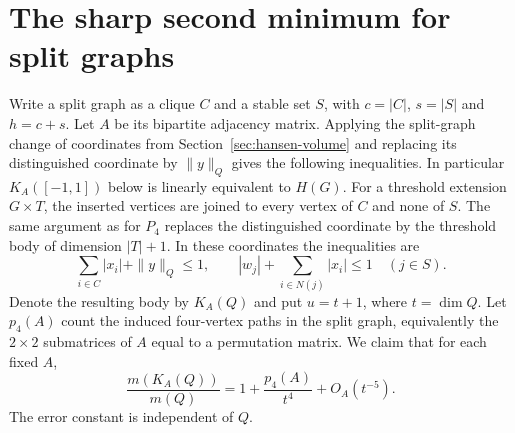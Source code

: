 \documentclass[11pt,a4paper]{article}
\numberwithin{equation}{section}
\begin{document}
\section{The sharp second minimum for split graphs}\label{sec:split-correction}
Write a split graph as a clique $C$ and a stable set $S$, with $c=|C|$, $s=|S|$ and $h=c+s$. Let $A$ be its bipartite adjacency matrix. Applying the split-graph change of coordinates from Section~\ref{sec:hansen-volume} and replacing its distinguished coordinate by $\|y\|_Q$ gives the following inequalities. In particular $K_A([-1,1])$ below is linearly equivalent to $H(G)$. For a threshold extension $G\times T$, the inserted vertices are joined to every vertex of $C$ and none of $S$. The same argument as for $P_4$ replaces the distinguished coordinate by the threshold body of dimension $|T|+1$. In these coordinates the inequalities are
\[
 \sum_{i\in C}|x_i|+\|y\|_Q\le1,\qquad
 |w_j|+\sum_{i\in N(j)}|x_i|\le1\quad(j\in S).
\]
Denote the resulting body by $K_A(Q)$ and put $u=t+1$, where $t=\dim Q$. Let $p_4(A)$ count the induced four-vertex paths in the split graph, equivalently the $2\times2$ submatrices of $A$ equal to a permutation matrix. We claim that for each fixed $A$,
\begin{equation}
 \frac{m(K_A(Q))}{m(Q)}=1+\frac{p_4(A)}{t^4}+O_A(t^{-5}).
 \label{eq:p4-asym}
\end{equation}
The error constant is independent of $Q$.
\end{document}

